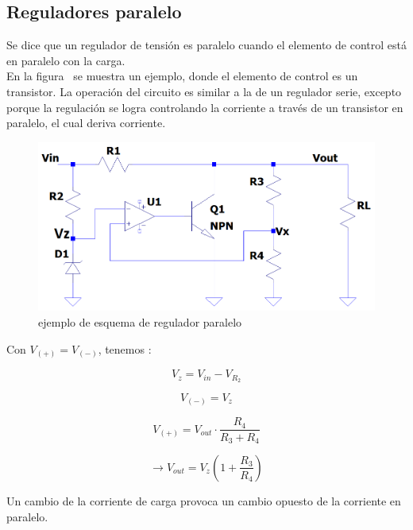 \subsection{Reguladores paralelo}

Se dice que un regulador de tensión es paralelo cuando el elemento de control está en paralelo con la carga.\\
En la figura~ se muestra un ejemplo, donde el elemento de control es un transistor. La operación del circuito es similar a la de un regulador serie, excepto porque la regulación se logra controlando la corriente a través de un transistor en paralelo, el cual deriva corriente.\\


\begin{figure}[H] %
\begin{center}
\includegraphics[width=0.6 \textwidth, angle=0]{./img/reguladores/parallel_regulator_example.png}
\caption{\label{fig:fig_parallel_regulator_example}\footnotesize{ejemplo de esquema de regulador paralelo}}
\end{center}
\end{figure}


Con $V_{(+)} = V_{(-)}$, tenemos :

\begin{equation*}
V_{z} = V_{in} - V_{R_{2}}
\end{equation*}

\begin{equation*}
V_{(-)} = V_{z}
\end{equation*}

\begin{equation*}
V_{(+)} = V_{out} \cdot  \frac{R_{4}}{R_{3} + R_{4}}
\end{equation*}


\begin{equation*}
\longrightarrow  V_{out} = V_{z} \left( 1 + \frac{R_{3}}{R_{4}} \right)
\end{equation*}



Un  cambio de la corriente de carga provoca un cambio opuesto de la corriente en paralelo.\\

